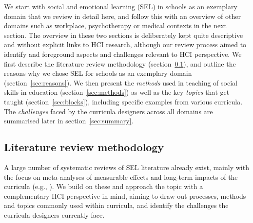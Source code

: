 \documentclass[prodmode,acmtochi]{acmsmall}
\begin{document}
        We start with social and emotional learning (SEL) in schools as an exemplary domain that we review in detail here, and follow this with an overview of other domains such as workplace, psychotherapy or medical contexts in the next section. 
        The overview in these two sections is deliberately kept quite descriptive and without explicit links to HCI research, although our review process aimed to identify and foreground aspects and challenges relevant to HCI perspective.
%
        We first describe the literature review methodology (section~\ref{sec:methodology}), and outline the reasons why we chose SEL for schools as an exemplary domain (section~\ref{sec:reasons}).
        We then present the \emph{methods} used in teaching of social skills in education (section~\ref{sec:methods})  as well as the key \emph{topics} that  get taught (section~\ref{sec:blocks}), including specific examples from various curricula. The \emph{challenges} faced by the curricula designers across all domains are summarised later in section~\ref{sec:summary}. %

        
\subsection{Literature review methodology}      
\label{sec:methodology}
A large number of systematic reviews of SEL literature already exist, mainly with the focus on meta-analyses of measurable effects and long-term impacts of the curricula (e.g., \cite{Durlak2011,Weare2011,Adi2007a,Greenberg2010,Elbertson2009,Payton2008}).
%
We build on these and approach the topic with a complementary HCI perspective in mind, aiming to draw out processes, methods and topics commonly used within curricula, and identify the challenges the curricula designers currently face. 
\end{document}

